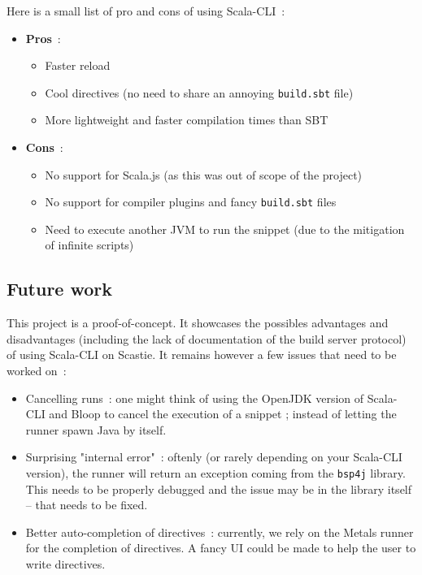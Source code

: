 \documentclass{article}
\begin{document}
Here is a small list of pro and cons of using Scala-CLI~:

\begin{itemize}
    \item \textbf{Pros}~: \begin{itemize}
        \item Faster reload
        \item Cool directives (no need to share an annoying \lstinline{build.sbt} file)
        \item More lightweight and faster compilation times than SBT
    \end{itemize}
    \item \textbf{Cons}~: \begin{itemize}
        \item No support for Scala.js (as this was out of scope of the project)
        \item No support for compiler plugins and fancy \lstinline{build.sbt} files
        \item Need to execute another JVM to run the snippet (due to the mitigation of infinite scripts)
    \end{itemize}
\end{itemize}

\subsection{Future work}

This project is a proof-of-concept. It showcases the possibles advantages and disadvantages (including the lack of documentation of the build server protocol) of using Scala-CLI on Scastie.
It remains however a few issues that need to be worked on~:

\begin{itemize}
    \item Cancelling runs~: one might think of using the OpenJDK version of Scala-CLI and Bloop to cancel the execution of a snippet ; instead of letting the runner spawn Java by itself.
    \item Surprising "internal error"~: oftenly (or rarely depending on your Scala-CLI version), the runner will return an exception coming from the \lstinline{bsp4j} library. This needs to be properly debugged and the issue may be in the library itself -- that needs to be fixed.
    \item Better auto-completion of directives~: currently, we rely on the Metals runner for the completion of directives. A fancy UI could be made to help the user to write directives.
\end{itemize}
\end{document}
